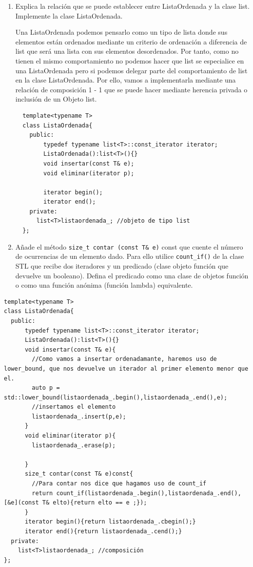 \begin{enumerate}[label = \alph*)]
  \item Explica la relación que se puede establecer entre ListaOrdenada y la clase list. Implemente la clase ListaOrdenada.
  
  Una ListaOrdenada podemos pensarlo como un tipo de lista donde sus elementos están ordenados mediante un criterio de ordenación a diferencia de list que será una lista con sus elementos desordenados.
  Por tanto, como no tienen el mismo comportamiento no podemos hacer que list se especialice en una ListaOrdenada pero si podemos delegar parte del comportamiento de list en la clase ListaOrdenada. Por ello, vamos a implementarla mediante una relación de composición 1 - 1 que se puede hacer mediante herencia privada o inclusión de un Objeto list.
\begin{verbatim}
  template<typename T>
  class ListaOrdenada{
    public:
        typedef typename list<T>::const_iterator iterator;
        ListaOrdenada():list<T>(){}
        void insertar(const T& e);
        void eliminar(iterator p);
  
        iterator begin();
        iterator end();
    private:
      list<T>listaordenada_; //objeto de tipo list
  };
\end{verbatim}
\newpage
  \item Añade el método \texttt{size\_t contar (const T\& e)} const que cuente el número de ocurrencias de un elemento dado. Para ello utilice \texttt{count\_if()} de la clase STL que recibe dos iteradores y un predicado (clase objeto función que devuelve un booleano). Defina el predicado como una clase de objetos función o como una función anónima (función lambda) equivalente.
\end{enumerate}
\begin{verbatim}
template<typename T>
class ListaOrdenada{
  public:
      typedef typename list<T>::const_iterator iterator;
      ListaOrdenada():list<T>(){}
      void insertar(const T& e){
        //Como vamos a insertar ordenadamante, haremos uso de lower_bound, que nos devuelve un iterador al primer elemento menor que el.
        auto p = std::lower_bound(listaordenada_.begin(),listaordenada_.end(),e);
        //insertamos el elemento
        listaordenada_.insert(p,e);
      }
      void eliminar(iterator p){
        listaordenada_.erase(p);

      }
      size_t contar(const T& e)const{
        //Para contar nos dice que hagamos uso de count_if
        return count_if(listaordenada_.begin(),listaordenada_.end(),[&e](const T& elto){return elto == e ;});
      }
      iterator begin(){return listaordenada_.cbegin();}
      iterator end(){return listaordenada_.cend();}
  private:
    list<T>listaordenada_; //composición
};
\end{verbatim}
